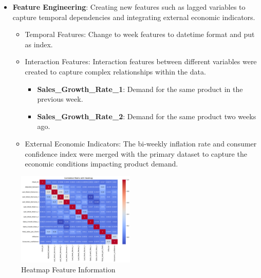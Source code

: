 \documentclass[letterpaper, 10 pt, conference]{ieeeconf}  %
\begin{document}
\begin{itemize}
        \item \textbf{Feature Engineering}: Creating new features such as lagged variables to capture temporal dependencies and integrating external economic indicators.
        \begin{itemize}
                \item Temporal Features: Change to week features to datetime format and put as index.
                \item Interaction Features: Interaction features between different variables were created to capture complex relationships within the data.
                \begin{itemize}
                        \item \textbf{Sales\_Growth\_Rate\_1}: Demand for the same product in the previous week.
                        \item \textbf{Sales\_Growth\_Rate\_2}: Demand for the same product two weeks ago.   
                \end{itemize}
                \item External Economic Indicators: The bi-weekly inflation rate and consumer confidence index were merged with the primary dataset to capture the economic conditions impacting product demand.
        \end{itemize}
\end{itemize}

\begin{figure}[H] 
        \begin{center}
        \centering
        \includegraphics[width=0.5\textwidth]{images/output.png}
        \caption{Heatmap Feature Information}
        \end{center}
\end{figure} 
\end{document}
